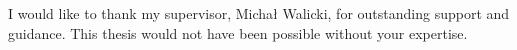 I would like to thank my supervisor, Michał Walicki, for outstanding support and guidance.
This thesis would not have been possible without your expertise.
